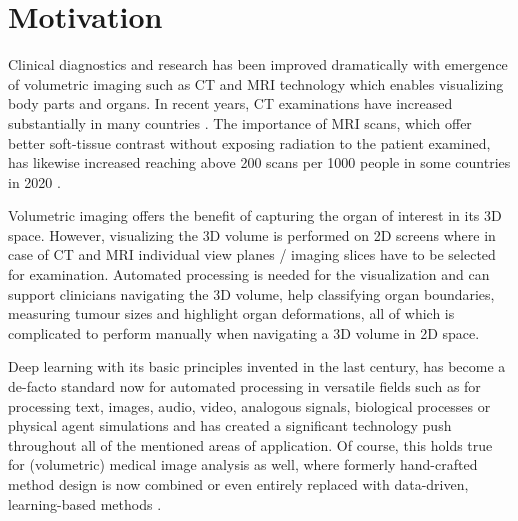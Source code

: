 



\section{Motivation} %
    Clinical diagnostics and research has been improved dramatically with emergence of volumetric imaging such as \ac{CT} and \ac{MRI} technology which enables visualizing body parts and organs.
    In recent years, \ac{CT} examinations have increased substantially in many countries \citep{westmark2023increasing, masjedi2020european, martella2023diagnostic}. The importance of \ac{MRI} scans, which offer better soft-tissue contrast without exposing radiation to the patient examined, has likewise increased reaching above 200 scans per 1000 people in some countries in 2020 \citep{martella2023diagnostic}.

    Volumetric imaging offers the benefit of capturing the organ of interest in its \ac{3D} space. However, visualizing the \ac{3D} volume is performed on \ac{2D} screens where in case of \ac{CT} and \ac{MRI}
    individual view planes / imaging slices have to be selected for examination. Automated processing is needed
    for the visualization
    and can support clinicians navigating the \ac{3D} volume, help classifying organ boundaries, measuring tumour sizes and highlight organ deformations, all of which is complicated to perform manually when navigating a \ac{3D} volume in \ac{2D} space.

    Deep learning with its basic principles invented in the last century, has become a de-facto standard now for automated processing in versatile fields such as for processing text, images, audio, video, analogous signals, biological processes or physical agent simulations
    \citep{%
        ouyang2022training, %
        kirillov2023segment, %
        birtchnell2018listening,%
        huang2020movienet,%
        sahoo2020machine,%
        jumper2021highly,%
        makoviychuk2021isaac,%
    }
    and has created a significant technology push throughout all of the mentioned areas of application.
    Of course, this holds true for (volumetric) medical image analysis as well, where formerly hand-crafted method design is now combined or even entirely replaced with data-driven, learning-based methods \citep{hosny2018artificial, rajpurkar2022ai}.

